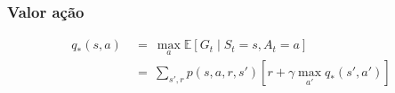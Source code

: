 \documentclass{article}
\begin{document}
            \subsubsection{Valor ação}
            
                \begin{equation}
                \begin{split}
                    q_*(s, a) & \ = \ \max_{a} \mathbb{E}[G_t \mid S_t = s, A_t = a] \\
                    & \ = \ \sum_{s', r} p(s, a, r, s') [r + \gamma \max_{a'} q_*(s', a')]
                \end{split}
                \end{equation}
\end{document}
